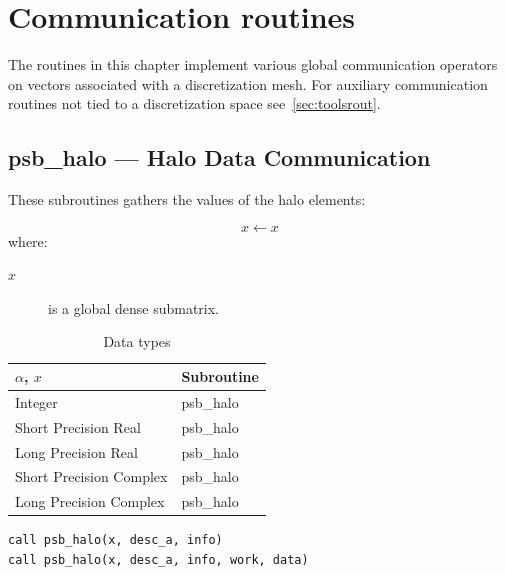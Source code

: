 \section{Communication routines}
%
%
The routines in this chapter implement various global communication operators
on vectors associated with a discretization mesh. For auxiliary communication
routines not tied to a discretization space see~\ref{sec:toolsrout}.

\clearpage\subsection*{psb\_halo --- Halo Data Communication}
    

These subroutines gathers the values of the halo
elements:

\[ x \leftarrow x \]
where:
\begin{description}
\item[$x$] is a global dense  submatrix.
\end{description}

\begin{table}[h]
\begin{center}
\begin{tabular}{ll}
\hline
$\alpha$, $x$ & {\bf Subroutine}\\
\hline
Integer           & psb\_halo \\
Short Precision Real & psb\_halo \\
Long Precision Real & psb\_halo \\
Short Precision Complex & psb\_halo \\
Long Precision Complex & psb\_halo \\
\hline
\end{tabular}
\end{center}
\caption{Data types\label{tab:f90halo}}
\end{table}

\begin{lstlisting}
call psb_halo(x, desc_a, info)
call psb_halo(x, desc_a, info, work, data)
\end{lstlisting}

